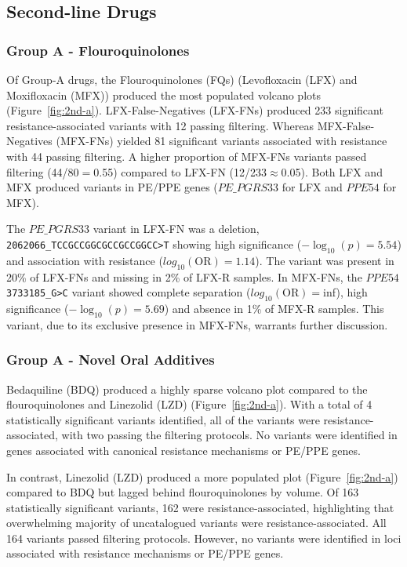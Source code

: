 

\subsection{Second-line Drugs}

\subsubsection{Group A - Flouroquinolones}

Of Group-A drugs, the Flouroquinolones (FQs) (Levofloxacin (LFX) and Moxifloxacin (MFX)) produced the most populated volcano plots (Figure~\ref{fig:2nd-a}). LFX-False-Negatives (LFX-FNs) produced 233 significant resistance-associated variants with 12 passing filtering. Whereas MFX-False-Negatives (MFX-FNs) yielded 81 significant variants associated with resistance with 44 passing filtering. A higher proportion of MFX-FNs variants passed filtering (44/80$=$0.55) compared to LFX-FN (12/233$\approx$0.05). Both LFX and MFX produced variants in PE/PPE genes ($PE\_PGRS33$ for LFX and $PPE54$ for MFX).

The $PE\_PGRS33$ variant in LFX-FN was a deletion, \texttt{2062066\_TCCGCCGGCGCCGCCGGCC>T} showing high significance ($-\log_{10}(p)=5.54$) and association with resistance ($log_{10}(\text{OR})=1.14$). The variant was present in 20\% of LFX-FNs and missing in 2\% of LFX-R samples. In MFX-FNs, the $PPE54$ \texttt{3733185\_G>C} variant showed complete separation ($log_{10}(\text{OR})=$inf), high significance ($-\log_{10}(p)=5.69$) and absence in 1\% of MFX-R samples. This variant, due to its exclusive presence in MFX-FNs, warrants further discussion.

\subsubsection{Group A - Novel Oral Additives}

Bedaquiline (BDQ) produced a highly sparse volcano plot compared to the flouroquinolones and Linezolid (LZD) (Figure~\ref{fig:2nd-a}). With a total of 4 statistically significant variants identified, all of the variants were resistance-associated, with two passing the filtering protocols. No variants were identified in genes associated with canonical resistance mechanisms or PE/PPE genes. 

In contrast, Linezolid (LZD) produced a more populated plot (Figure~\ref{fig:2nd-a}) compared to BDQ but lagged behind flouroquinolones by volume. Of 163 statistically significant variants, 162 were resistance-associated, highlighting that overwhelming majority of uncatalogued variants were resistance-associated. All 164 variants passed filtering protocols. However, no variants were identified in loci associated with resistance mechanisms or PE/PPE genes. 

